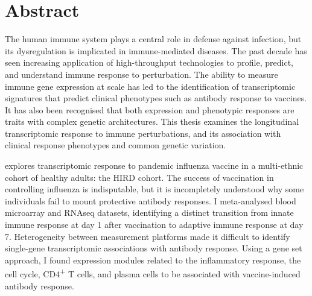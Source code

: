 %
%

\chapter{Abstract}

\begin{flushleft}

    \begin{LARGE}
        \thetitle
    \end{LARGE}

    \vspace{1em}

    \begin{large}
        \theauthor
    \end{large}

    \vspace{1em}

\end{flushleft}

The human immune system plays a central role in defense against infection, 
but its dysregulation is implicated in immune-mediated diseases.
The past decade has seen increasing application of high-throughput technologies to profile, predict, and understand immune response to perturbation.
The ability to measure immune gene expression at scale has led to the identification of 
transcriptomic signatures that predict clinical phenotypes such as antibody response to vaccines.
It has also been recognised that both expression and phenotypic responses are traits with complex genetic architectures.
This thesis examines the longitudinal transcriptomic response to immune perturbations,
and its association with clinical response phenotypes and common genetic variation.

 explores transcriptomic response to pandemic influenza vaccine in a multi-ethnic cohort of healthy adults: the \gls{HIRD} cohort.
The success of vaccination in controlling influenza is indisputable, 
but it is incompletely understood why some individuals fail to mount protective antibody responses.
I meta-analysed blood microarray and \gls{RNAseq} datasets, 
identifying a distinct transition from innate immune response at day 1 after vaccination to adaptive immune response at day 7.
Heterogeneity between measurement platforms made it difficult to identify single-gene transcriptomic associations with antibody response.
Using a gene set approach, I found expression modules related to the inflammatory response, the cell cycle, CD4\textsuperscript{+} T cells, and plasma cells 
to be associated with vaccine-induced antibody response.

